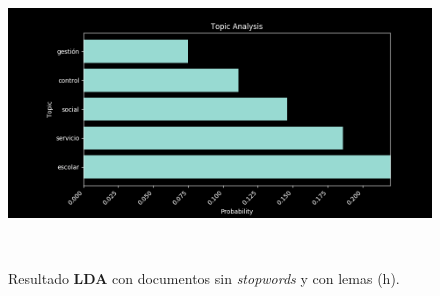 \begin{itemize}
\begin{figure}[H]
            \includegraphics[height=8cm, width=16.5cm]{Latex/Classes/Imagenes/ns_wl-8.png}
            \caption{Resultado \textbf{LDA} con documentos sin \textit{stopwords} y con lemas (h).}
            \label{fig:ns_wl-8}
        \end{figure}
        
    \end{itemize}